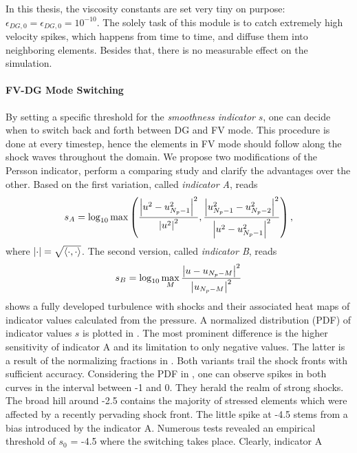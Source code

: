 In this thesis, the viscosity constants are set very tiny on purpose:
$\epsilon_{DG,0} = \epsilon_{DG,0} = 10^{-10}$. The solely task of this module
is to catch extremely high velocity spikes, which happens from time to time,
and diffuse them into neighboring elements. Besides that, there is no measurable
effect on the simulation.

\paragraph{FV-DG Mode Switching}
By setting a specific threshold for the \emph{smoothness indicator} $s$, one can
decide when to switch back and forth between DG and FV mode. This procedure is
done at every timestep, hence the elements in FV mode should follow along the
shock waves throughout the domain.  We propose two modifications of the Persson
indicator, perform a comparing study and clarify the advantages over the other.
Based on  the first variation, called \emph{indicator
A}, reads
\begin{equation}
\label{eqn:indicator-A}
    s_A = \log_{10} \max \left(
        \frac{\left|u^2 - u_{N_p-1}^2\right|^2}{\left|u^2\right|^2},
        \frac{\left|u_{N_p-1}^2 - u_{N_p-2}^2\right|^2}{\left|u^2 - u_{N_p-1}^2\right|^2}
    \right),
\end{equation}
where $\left|\cdot\right| = \sqrt{\left\langle\cdot,\cdot\right\rangle}$.  The second version, called
\emph{indicator B}, reads
\begin{equation}
    s_B = \log_{10} \max_M \frac{\left|u - u_{N_p-M}\right|^2}{\left|u_{N_p-M}\right|^2}
\end{equation}
 shows a fully developed turbulence with shocks and
their associated heat maps of indicator values calculated from the pressure.  A
normalized distribution (PDF) of indicator values $s$ is plotted in
.  The most prominent difference is the higher
sensitivity of indicator A and its limitation to only negative values. The
latter is a result of the normalizing fractions in . Both
variants trail the shock fronts with sufficient accuracy. Considering the PDF
in , one can observe spikes in both curves in the
interval between -1 and 0. They herald the realm of strong shocks. The broad
hill around -2.5 contains the majority of stressed elements which were affected
by a recently pervading shock front.  The little spike at -4.5 stems from a
bias introduced by the indicator A. Numerous tests revealed an empirical
threshold of $s_0$ = -4.5 where the switching takes place. Clearly, indicator A
